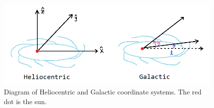 \documentclass{scrartcl}
\def\tus{\textunderscore}
\begin{document}
\begin{figure}[h]
    \centering
    \includegraphics[scale=0.7]{coords.png}
    \caption{Diagram of Heliocentric and Galactic coordinate systems. The red dot is the sun.}
\end{figure}





\end{document}
